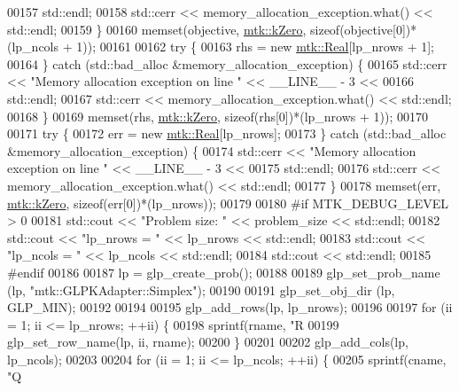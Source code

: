 \begin{DoxyCode}
00157       std::endl;
00158     std::cerr << memory\_allocation\_exception.what() << std::endl;
00159   \}
00160   memset(objective, \hyperlink{group__c01-roots_ga59a451a5fae30d59649bcda274fea271}{mtk::kZero}, \textcolor{keyword}{sizeof}(objective[0])*(lp\_ncols + 1));
00161 
00162   \textcolor{keywordflow}{try} \{
00163     rhs = \textcolor{keyword}{new} \hyperlink{group__c01-roots_gac080bbbf5cbb5502c9f00405f894857d}{mtk::Real}[lp\_nrows + 1];
00164   \} \textcolor{keywordflow}{catch} (std::bad\_alloc &memory\_allocation\_exception) \{
00165     std::cerr << \textcolor{stringliteral}{"Memory allocation exception on line "} << \_\_LINE\_\_ - 3 <<
00166       std::endl;
00167     std::cerr << memory\_allocation\_exception.what() << std::endl;
00168   \}
00169   memset(rhs, \hyperlink{group__c01-roots_ga59a451a5fae30d59649bcda274fea271}{mtk::kZero}, \textcolor{keyword}{sizeof}(rhs[0])*(lp\_nrows + 1));
00170 
00171   \textcolor{keywordflow}{try} \{
00172     err = \textcolor{keyword}{new} \hyperlink{group__c01-roots_gac080bbbf5cbb5502c9f00405f894857d}{mtk::Real}[lp\_nrows];
00173   \} \textcolor{keywordflow}{catch} (std::bad\_alloc &memory\_allocation\_exception) \{
00174     std::cerr << \textcolor{stringliteral}{"Memory allocation exception on line "} << \_\_LINE\_\_ - 3 <<
00175       std::endl;
00176     std::cerr << memory\_allocation\_exception.what() << std::endl;
00177   \}
00178   memset(err, \hyperlink{group__c01-roots_ga59a451a5fae30d59649bcda274fea271}{mtk::kZero}, \textcolor{keyword}{sizeof}(err[0])*(lp\_nrows));
00179 
00180 \textcolor{preprocessor}{  #if MTK\_DEBUG\_LEVEL > 0}
00181   std::cout << \textcolor{stringliteral}{"Problem size: "} << problem\_size << std::endl;
00182   std::cout << \textcolor{stringliteral}{"lp\_nrows = "} << lp\_nrows << std::endl;
00183   std::cout << \textcolor{stringliteral}{"lp\_ncols = "} << lp\_ncols << std::endl;
00184   std::cout << std::endl;
00185 \textcolor{preprocessor}{  #endif}
00186 
00187   lp = glp\_create\_prob();
00188 
00189   glp\_set\_prob\_name (lp, \textcolor{stringliteral}{"mtk::GLPKAdapter::Simplex"});
00190 
00191   glp\_set\_obj\_dir (lp, GLP\_MIN);
00192 
00194 
00195   glp\_add\_rows(lp, lp\_nrows);
00196 
00197   \textcolor{keywordflow}{for} (ii = 1; ii <= lp\_nrows; ++ii) \{
00198     sprintf(rname, \textcolor{stringliteral}{"R%
00199     glp\_set\_row\_name(lp, ii, rname);
00200   \}
00201 
00202   glp\_add\_cols(lp, lp\_ncols);
00203 
00204   \textcolor{keywordflow}{for} (ii = 1; ii <= lp\_ncols; ++ii) \{
00205     sprintf(cname, \textcolor{stringliteral}{"Q%
}}
\end{DoxyCode}
